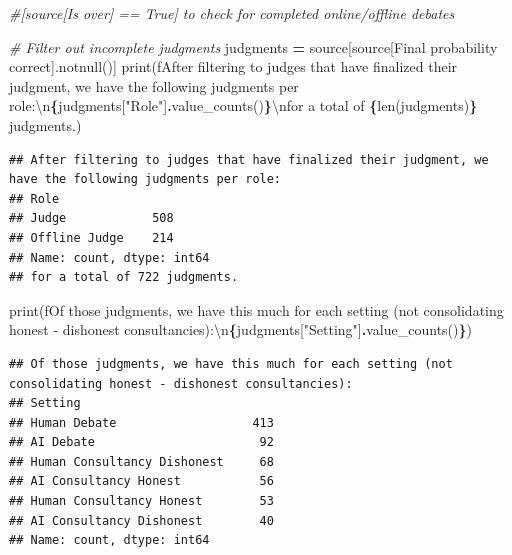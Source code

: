 \documentclass[
]{article}
\newenvironment{Shaded}{\begin{snugshade}}{\end{snugshade}}
\newcommand{\BuiltInTok}[1]{#1}
\newcommand{\CharTok}[1]{\textcolor[rgb]{0.31,0.60,0.02}{#1}}
\newcommand{\CommentTok}[1]{\textcolor[rgb]{0.56,0.35,0.01}{\textit{#1}}}
\newcommand{\NormalTok}[1]{#1}
\newcommand{\OperatorTok}[1]{\textcolor[rgb]{0.81,0.36,0.00}{\textbf{#1}}}
\newcommand{\SpecialCharTok}[1]{\textcolor[rgb]{0.81,0.36,0.00}{\textbf{#1}}}
\newcommand{\SpecialStringTok}[1]{\textcolor[rgb]{0.31,0.60,0.02}{#1}}
\newcommand{\StringTok}[1]{\textcolor[rgb]{0.31,0.60,0.02}{#1}}
\begin{document}
\begin{Shaded}
\begin{Highlighting}[]
\CommentTok{\#[source[\textquotesingle{}Is over\textquotesingle{}] == True] to check for completed online/offline debates}

\CommentTok{\# Filter out incomplete judgments}
\NormalTok{judgments }\OperatorTok{=}\NormalTok{ source[source[}\StringTok{\textquotesingle{}Final probability correct\textquotesingle{}}\NormalTok{].notnull()]}
\BuiltInTok{print}\NormalTok{(}\SpecialStringTok{f\textquotesingle{}After filtering to judges that have finalized their judgment, we have the following judgments per role:}\CharTok{\textbackslash{}n}\SpecialCharTok{\{}\NormalTok{judgments[}\StringTok{"Role"}\NormalTok{]}\SpecialCharTok{.}\NormalTok{value\_counts()}\SpecialCharTok{\}}\CharTok{\textbackslash{}n}\SpecialStringTok{for a total of }\SpecialCharTok{\{}\BuiltInTok{len}\NormalTok{(judgments)}\SpecialCharTok{\}}\SpecialStringTok{ judgments.\textquotesingle{}}\NormalTok{)}
\end{Highlighting}
\end{Shaded}

\begin{verbatim}
## After filtering to judges that have finalized their judgment, we have the following judgments per role:
## Role
## Judge            508
## Offline Judge    214
## Name: count, dtype: int64
## for a total of 722 judgments.
\end{verbatim}

\begin{Shaded}
\begin{Highlighting}[]
\BuiltInTok{print}\NormalTok{(}\SpecialStringTok{f\textquotesingle{}Of those judgments, we have this much for each setting (not consolidating honest {-} dishonest consultancies):}\CharTok{\textbackslash{}n}\SpecialCharTok{\{}\NormalTok{judgments[}\StringTok{"Setting"}\NormalTok{]}\SpecialCharTok{.}\NormalTok{value\_counts()}\SpecialCharTok{\}}\SpecialStringTok{\textquotesingle{}}\NormalTok{)}
\end{Highlighting}
\end{Shaded}

\begin{verbatim}
## Of those judgments, we have this much for each setting (not consolidating honest - dishonest consultancies):
## Setting
## Human Debate                   413
## AI Debate                       92
## Human Consultancy Dishonest     68
## AI Consultancy Honest           56
## Human Consultancy Honest        53
## AI Consultancy Dishonest        40
## Name: count, dtype: int64
\end{verbatim}
\end{document}
